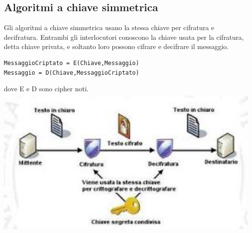 \documentclass[a4paper, 12 pt, italian]{report}
\begin{document}
\subsection{Algoritmi a chiave simmetrica}
Gli algoritmi a chiave simmetrica usano la stessa chiave per cifratura e decifratura. Entrambi gli interlocutori conoscono la chiave usata per la cifratura, detta chiave privata, e soltanto loro possono cifrare e decifrare il messaggio.\\
\begin{verbatim}
MessaggioCriptato = E(Chiave,Messaggio)
Messaggio = D(Chiave,MessaggioCriptato)
\end{verbatim}
dove E e D sono cipher noti.\\
\includegraphics[height=75mm, width=150mm]{simmetrica}
\end{document}

